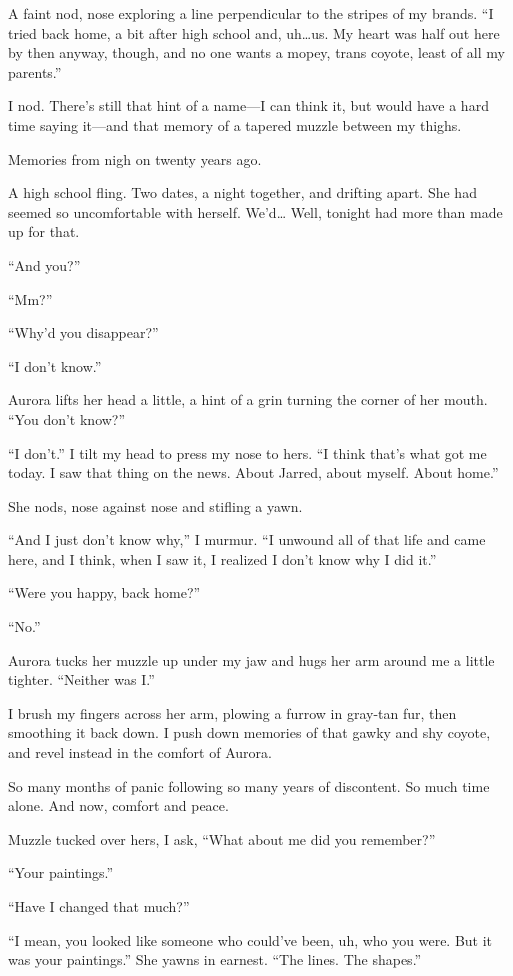 A faint nod, nose exploring a line perpendicular to the stripes of my brands. ``I tried back home, a bit after high school and, uh\ldots{}us. My heart was half out here by then anyway, though, and no one wants a mopey, trans coyote, least of all my parents.''

I nod. There's still that hint of a name---I can think it, but would have a hard time saying it---and that memory of a tapered muzzle between my thighs.

Memories from nigh on twenty years ago.

A high school fling. Two dates, a night together, and drifting apart. She had seemed so uncomfortable with herself. We'd\ldots{} Well, tonight had more than made up for that.

``And you?''

``Mm?''

``Why'd you disappear?''

``I don't know.''

Aurora lifts her head a little, a hint of a grin turning the corner of her mouth. ``You don't know?''

``I don't.'' I tilt my head to press my nose to hers. ``I think that's what got me today. I saw that thing on the news. About Jarred, about myself. About home.''

She nods, nose against nose and stifling a yawn.

``And I just don't know why,'' I murmur. ``I unwound all of that life and came here, and I think, when I saw it, I realized I don't know why I did it.''

``Were you happy, back home?''

``No.''

Aurora tucks her muzzle up under my jaw and hugs her arm around me a little tighter. ``Neither was I.''

I brush my fingers across her arm, plowing a furrow in gray-tan fur, then smoothing it back down. I push down memories of that gawky and shy coyote, and revel instead in the comfort of Aurora.

So many months of panic following so many years of discontent. So much time alone. And now, comfort and peace.

Muzzle tucked over hers, I ask, ``What about me did you remember?''

``Your paintings.''

``Have I changed that much?''

``I mean, you looked like someone who could've been, uh, who you were. But it was your paintings.'' She yawns in earnest. ``The lines. The shapes.''

